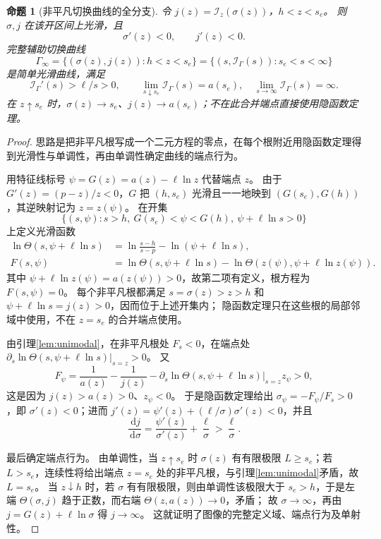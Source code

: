 \documentclass[11pt,a4paper,UTF8]{ctexart}
\newtheorem{proposition}[theorem]{命题}
\theoremstyle{definition}
\newcommand{\dd}{\,\mathrm d}
\begin{document}
\begin{proposition}[非平凡切换曲线的全分支]
\label{prop:Gamma-geometry}
令 $j(z)=\mathcal I_z(\sigma(z))$，$h<z<s_e$。
则 $\sigma,j$ 在该开区间上光滑，且
\begin{equation}
\sigma'(z)<0,\qquad j'(z)<0.
\label{eq:sigma-monotone}
\end{equation}
完整辅助切换曲线
\begin{equation}
\Gamma_\infty=\{(\sigma(z),j(z)):h<z<s_e\}
=\{(s,\mathcal I_\Gamma(s)):s_e<s<\infty\}
\label{eq:switch-param}
\end{equation}
是简单光滑曲线，满足
\begin{equation}
\mathcal I_\Gamma'(s)>\ell/s>0,
\qquad
\lim_{s\downarrow s_e}\mathcal I_\Gamma(s)=a(s_e),\quad
\lim_{s\to\infty}\mathcal I_\Gamma(s)=\infty.
\label{eq:Gamma-slope}
\end{equation}
在 $z\uparrow s_e$ 时，$\sigma(z)\to s_e$、$j(z)\to a(s_e)$；不在此合并端点直接使用隐函数定理。
\end{proposition}
\begin{proof}
思路是把非平凡根写成一个二元方程的零点，在每个根附近用隐函数定理得到光滑性与单调性，再由单调性确定曲线的端点行为。

用特征线标号 $\psi=G(z)=a(z)-\ell\ln z$ 代替端点 $z$。
由于 $G'(z)=(p-z)/z<0$，$G$ 把 $(h,s_e)$ 光滑且一一地映到 $(G(s_e),G(h))$，其逆映射记为 $z=z(\psi)$。
在开集
\[
\{(s,\psi):s>h,\ G(s_e)<\psi<G(h),\ \psi+\ell\ln s>0\}
\]
上定义光滑函数
\[
\begin{aligned}
\ln\Theta(s,\psi+\ell\ln s)&=\ln\frac{s-h}{s-p}-\ln(\psi+\ell\ln s),\\
F(s,\psi)&=\ln\Theta(s,\psi+\ell\ln s)-\ln\Theta(z(\psi),\psi+\ell\ln z(\psi)).
\end{aligned}
\]
其中 $\psi+\ell\ln z(\psi)=a(z(\psi))>0$，故第二项有定义，根方程为 $F(s,\psi)=0$。
每个非平凡根都满足 $s=\sigma(z)>z>h$ 和 $\psi+\ell\ln s=j(z)>0$，因而位于上述开集内；
隐函数定理只在这些根的局部邻域中使用，不在 $z=s_e$ 的合并端点使用。

由引理\ref{lem:unimodal}，在非平凡根处 $F_s<0$，在端点处 $\left.\partial_s\ln\Theta(s,\psi+\ell\ln s)\right|_{s=z}>0$。
又
\[
F_\psi=\frac1{a(z)}-\frac1{j(z)}-\left.\partial_s\ln\Theta(s,\psi+\ell\ln s)\right|_{s=z}z_\psi>0,
\]
这是因为 $j(z)>a(z)>0$、$z_\psi<0$。
于是隐函数定理给出 $\sigma_\psi=-F_\psi/F_s>0$，即 $\sigma'(z)<0$；进而 $j'(z)=\psi'(z)+(\ell/\sigma)\sigma'(z)<0$，并且
\[
\frac{\dd j}{\dd\sigma}=\frac{\psi'(z)}{\sigma'(z)}+\frac\ell\sigma>\frac\ell\sigma.
\]

最后确定端点行为。
由单调性，当 $z\uparrow s_e$ 时 $\sigma(z)$ 有有限极限 $L\ge s_e$；若 $L>s_e$，连续性将给出端点 $z=s_e$ 处的非平凡根，与引理\ref{lem:unimodal}矛盾，故 $L=s_e$。
当 $z\downarrow h$ 时，若 $\sigma$ 有有限极限，则由单调性该极限大于 $s_e>h$，于是左端 $\Theta(\sigma,j)$ 趋于正数，而右端 $\Theta(z,a(z))\to0$，矛盾；
故 $\sigma\to\infty$，再由 $j=G(z)+\ell\ln\sigma$ 得 $j\to\infty$。
这就证明了图像的完整定义域、端点行为及单射性。
\end{proof}
\end{document}
